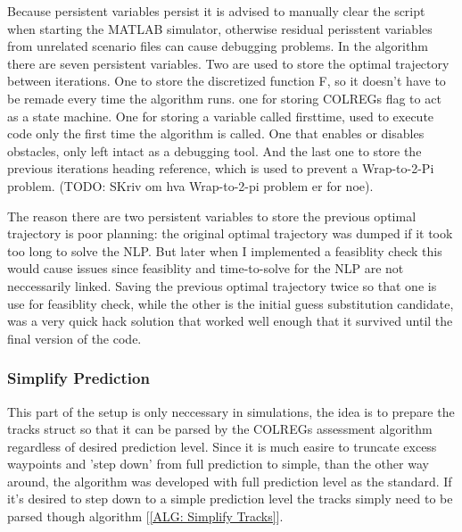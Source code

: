 Because persistent variables persist it is advised to manually clear the script when starting the MATLAB simulator, otherwise
residual perisstent variables from unrelated scenario files can cause debugging problems. In the algorithm there are seven
persistent variables. Two are used to store the optimal trajectory between iterations. One to store the discretized function F, so it doesn't have to be
remade every time the algorithm runs. one for storing COLREGs flag to act as a state machine. One for storing a variable called firsttime, 
used to execute code only the first time the algorithm is called. One that enables or disables obstacles, 
only left intact as a debugging tool. And the last one to store the previous iterations heading reference, which is used to prevent a
Wrap-to-2-Pi problem. (TODO: SKriv om hva Wrap-to-2-pi problem er for noe).

The reason there are two persistent variables to store the previous optimal trajectory is poor planning:
the original optimal trajectory was dumped if it took too long to solve the NLP. 
But later when I implemented a feasiblity check this would cause issues since feasiblity and time-to-solve for the NLP are not neccessarily linked.
Saving the previous optimal trajectory twice so that one is use for feasiblity check, while the other is the initial guess substitution candidate,
was a very quick hack solution that worked well enough that it survived until the final version of the code.


\subsubsection*{Simplify Prediction}
This part of the setup is only neccessary in simulations, the idea is to prepare the tracks struct so that it can be parsed by the COLREGs assessment algorithm
regardless of desired prediction level. Since it is much easire to truncate excess waypoints and 'step down' from full prediction to simple, than the other way around, the algorithm
was developed with full prediction level as the standard. If it's desired to step down to a simple prediction level the tracks simply need to be parsed though algorithm [\ref{ALG: Simplify Tracks}].


